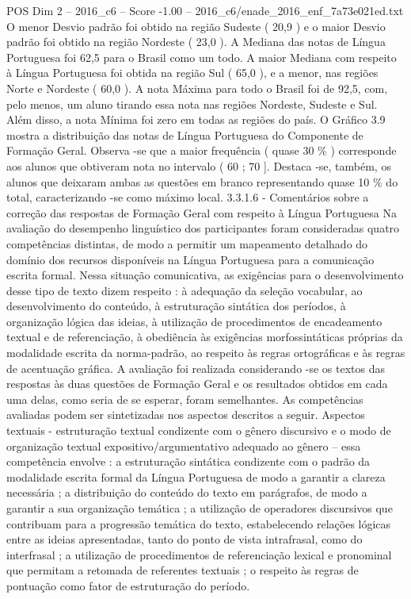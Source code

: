 \begin{textsample}{POS Dim 2 – 2016\_c6 – Score -1.00 – 2016\_c6/enade\_2016\_enf\_7a73e021ed.txt}
O menor Desvio padrão foi obtido na região Sudeste ( 20,9 ) e o maior Desvio padrão foi obtido na região Nordeste ( 23,0 ).
A Mediana das notas de Língua Portuguesa foi 62,5 para o Brasil como um todo.
A maior Mediana com respeito à Língua Portuguesa foi obtida na região Sul ( 65,0 ), e a menor, nas regiões Norte e Nordeste ( 60,0 ).
A nota Máxima para todo o Brasil foi de 92,5, com, pelo menos, um aluno tirando essa nota nas regiões Nordeste, Sudeste e Sul.
Além disso, a nota Mínima foi zero em todas as regiões do país.
O Gráfico 3.9 mostra a distribuição das notas de Língua Portuguesa do Componente de Formação Geral.
Observa -se que a maior frequência ( quase 30 \% ) corresponde aos alunos que obtiveram nota no intervalo ( 60 ; 70 ].
Destaca -se, também, os alunos que deixaram ambas as questões em branco representando quase 10 \% do total, caracterizando -se como máximo local. 3.3.1.6 - Comentários sobre a correção das respostas de Formação Geral com respeito à Língua Portuguesa Na avaliação do desempenho linguístico dos participantes foram consideradas quatro competências distintas, de modo a permitir um mapeamento detalhado do domínio dos recursos disponíveis na Língua Portuguesa para a comunicação escrita formal.
Nessa situação comunicativa, as exigências para o desenvolvimento desse tipo de texto dizem respeito : à adequação da seleção vocabular, ao desenvolvimento do conteúdo, à estruturação sintática dos períodos, à organização lógica das ideias, à utilização de procedimentos de encadeamento textual e de referenciação, à obediência às exigências morfossintáticas próprias da modalidade escrita da norma-padrão, ao respeito às regras ortográficas e às regras de acentuação gráfica.
A avaliação foi realizada considerando -se os textos das respostas às duas questões de Formação Geral e os resultados obtidos em cada uma delas, como seria de se esperar, foram semelhantes.
As competências avaliadas podem ser sintetizadas nos aspectos descritos a seguir.
Aspectos textuais - estruturação textual condizente com o gênero discursivo e o modo de organização textual expositivo/argumentativo adequado ao gênero – essa competência envolve : a estruturação sintática condizente com o padrão da modalidade escrita formal da Língua Portuguesa de modo a garantir a clareza necessária ; a distribuição do conteúdo do texto em parágrafos, de modo a garantir a sua organização temática ; a utilização de operadores discursivos que contribuam para a progressão temática do texto, estabelecendo relações lógicas entre as ideias apresentadas, tanto do ponto de vista intrafrasal, como do interfrasal ; a utilização de procedimentos de referenciação lexical e pronominal que permitam a retomada de referentes textuais ; o respeito às regras de pontuação como fator de estruturação do período.

\end{textsample}
